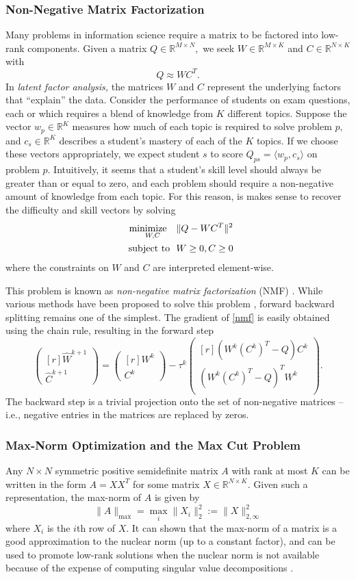 \documentclass{amsart}
\newcommand{\aln}[1]{\begin{align}#1\end{align}}
\newcommand{\ra}{\rangle}
\newcommand{\la}{\langle}
\newcommand{\st}{\hbox{ \,\,subject to\,\, }}
\newcommand{\matb}{\left( \begin{matrix*}[r] }
\newcommand{\mate}{\end{matrix*}\right)}
\newcommand{\kp}{^{k+1}}
\newcommand{\reals}{\mathbb{R}}
\DeclareMathOperator*{\minimize}{minimize\quad}
\theoremstyle{definition}
\begin{document}
\subsubsection{Non-Negative Matrix Factorization}
Many problems in information science require a matrix to be factored into low-rank components.  Given a matrix $Q\in \reals^{M\times N},$ we seek $W\in \reals^{M\times K}$ and $C\in \reals^{N\times K}$ with 
  $$Q\approx WC^T.$$
  In {\em latent factor analysis,} the matrices $W$ and $C$ represent the underlying factors that ``explain'' the data.  Consider the performance of students on exam questions, each or which requires a blend of knowledge from $K$ different topics.  Suppose the vector $w_p\in \reals^K$ measures how much of each topic is required to solve problem $p,$ and  $c_s\in \reals^K$ describes a student's mastery of each of the $K$ topics.  If we choose these vectors appropriately, we expect student $s$ to score $Q_{ps}= \la w_p,c_s\ra$ on problem $p.$   Intuitively, it seems that a student's skill level should always be greater than or equal to zero, and each problem should require a non-negative amount of knowledge from each topic.  For this reason, is makes sense to recover the difficulty and skill vectors by solving
   \aln{\minimize_{W,C} &\|  Q-WC^T  \|^2  \label{nmf}\\
   \st & W\ge 0, C \ge 0 \nonumber
   }
   where the constraints on $W$ and $C$ are interpreted element-wise.
   
   This problem is known as {\em non-negative matrix factorization} (NMF) \cite{LS99}.  While various methods have been proposed to solve this problem \cite{LMACD14, LS00}, forward backward splitting remains one of the simplest.  The gradient of \eqref{nmf} is easily obtained using the chain rule, resulting in the forward step 
      $$
      \matb
      \widehat W\kp \\ \widehat C\kp
      \mate
      = \matb
       W^k\\ C^k
      \mate
      -   \tau^k \matb
        (W^k(C^k)^T-Q)C^k \\
          (W^k(C^k)^T-Q)^TW^k \\
      \mate.
      $$
The backward step is a trivial projection onto the set of non-negative matrices -- i.e., negative entries in the matrices are replaced by zeros.
  
  
\subsubsection{Max-Norm Optimization and the Max Cut Problem}
Any $N\times N$ symmetric positive semidefinite matrix $A$ with rank at most $K$ can be written in the form $A=XX^T$ for some matrix $X\in \reals^{N\times K}$.  Given such a representation, the max-norm of $A$ is given by 
        $$\|A\|_{\max} = \max_i \|X_i\|^2_2 := \|X\|_{2,\infty}^2$$
    where $X_i$ is the $i$th row of $X.$  It can shown that the max-norm of a matrix is a good approximation to the nuclear norm (up to a constant factor), and can be used to promote low-rank solutions when the nuclear norm is not available because of the expense of computing singular value decompositions \cite{LRSST10}. 
	
\end{document}
